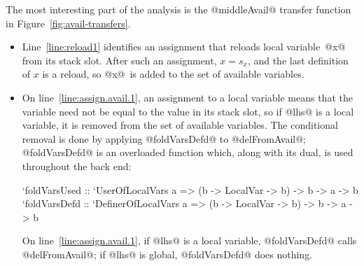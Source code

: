 \documentclass[blockstyle,preprint,natbib,nocopyrightspace]{sigplanconf}
\newcommand\lineref[1]{line~\ref{line:#1}}
\newcommand\Lineref[1]{Line~\ref{line:#1}}
\newcommand\slotof[1]{\ensuremath{s_{#1}}}
\def\finalremark#1{\relax}
\newcommand\figref[1]{Figure~\ref{fig:#1}}
\begin{document}

The most interesting part of the analysis is the @middleAvail@ transfer
function in \figref{avail-transfers}.\finalremark
{Let us revise the paper to pretend that global variables
don't exist.}
\begin{itemize}
\item
\Lineref{reload1} 
identifies an assignment that reloads local
variable~@x@ from its stack slot.\finalremark{I propose the compiler be
modified to use @isStackSlotOf@ as I've written. JD~approves.}
After such an assignment, $x = \slotof x$,
and the last definition of $x$ is a reload,
so @x@~is added to the set of available variables.
\item
On \lineref{assign.avail.1},
an assignment to a local variable means that the
variable need not be equal to the value in its stack
slot, so if @lhs@ is a local variable, it is removed from the set of
available variables.
The conditional removal is done by applying @foldVarsDefd@ to @delFromAvail@;
@foldVarsDefd@ is an overloaded function which, along with its dual,
is used throughout the back end:
\begin{code}
`foldVarsUsed :: `UserOfLocalVars a 
        => (b -> LocalVar -> b) -> b -> a -> b
`foldVarsDefd :: `DefinerOfLocalVars a 
        => (b -> LocalVar -> b) -> b -> a -> b
\end{code}
On \lineref{assign.avail.1},  if @lhs@ is a local variable,
@foldVarsDefd@ calls @delFromAvail@;
if @lhs@ is global, @foldVarsDefd@ does nothing.




\end{itemize}
\end{document}

